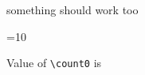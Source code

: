 \documentclass{article}
\begin{document}

something should work too

=10

Value of \verb|\count0| is 
\end{document}
